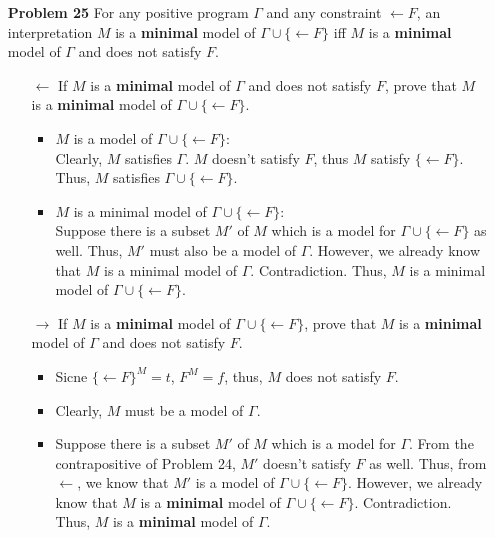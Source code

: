 \begin{enumerate}
\item[\textbf{Problem 25}] For any positive program $\Gamma$ and any constraint $\leftarrow F$, an interpretation $M$ is a \textbf{minimal} model of $\Gamma \cup \{\leftarrow F \}$ iff $M$ is a \textbf{minimal} model of $\Gamma$ and does not satisfy $F$. 
\begin{itemize}
    \item[$\leftarrow$] If $M$ is a \textbf{minimal} model of $\Gamma$ and does not satisfy $F$, prove that $M$ is a \textbf{minimal} model of $\Gamma \cup \{\leftarrow F \}$.
     \begin{itemize}
         \item $M$ is a model of $\Gamma \cup \{\leftarrow F \}$: \\
         Clearly, $M$ satisfies $\Gamma$. $M$ doesn't satisfy $F$, thus $M$ satisfy $\{\leftarrow F \}$. Thus,  $M$ satisfies $\Gamma \cup \{\leftarrow F \}$.
         \item $M$ is a minimal model of $\Gamma \cup \{\leftarrow F \}$:\\
          Suppose there is a subset $M'$ of $M$ which is a model for $\Gamma \cup \{\leftarrow F \}$ as well. Thus, $M'$ must also be a model of $\Gamma$. However, we already know that $M$ is a minimal model of $\Gamma$. Contradiction. Thus, $M$ is a minimal model of $\Gamma \cup \{\leftarrow F \}$. 
     \end{itemize}
     \item[$\rightarrow$] If $M$ is a \textbf{minimal} model of $\Gamma \cup \{\leftarrow F \}$, prove that $M$ is a \textbf{minimal} model of $\Gamma$ and does not satisfy $F$. 
     \begin{itemize}
         \item Sicne $\{\leftarrow F \}^M = t$, $F^M = f$, thus, $M$ does not satisfy $F$.
         \item Clearly, $M$ must be a model of $\Gamma$. 
         \item Suppose there is a subset $M'$ of $M$ which is a model for $\Gamma$. From the contrapositive of Problem 24, $M'$ doesn't satisfy $F$ as well. Thus, from $\leftarrow$, we know that $M'$ is a model of $\Gamma \cup \{\leftarrow F \}$. However, we already know that $M$ is a \textbf{minimal} model of $\Gamma \cup \{\leftarrow F \}$. Contradiction. Thus, $M$ is a \textbf{minimal} model of $\Gamma$. 
     \end{itemize}
\end{itemize}




\end{enumerate}
